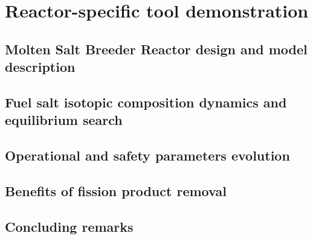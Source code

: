 \chapter[Reactor-specific tool demonstration]{Reactor-specific tool 
demonstration}

\section{Molten Salt Breeder Reactor design and model description}

\section{Fuel salt isotopic composition dynamics and equilibrium search}

\section{Operational and safety parameters evolution}

\section{Benefits of fission product removal}

\section{Concluding remarks}